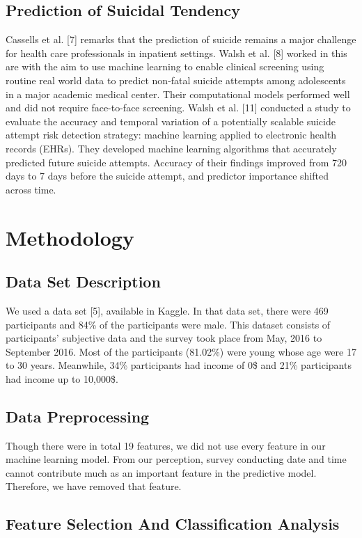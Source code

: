 \documentclass[conference]{IEEEtran}
\begin{document}
\subsection{Prediction of Suicidal Tendency}
Cassells et al. [7] remarks that the prediction of suicide remains a major challenge for health care professionals in inpatient settings. Walsh et al. [8] worked in this are with the aim to use machine learning to enable clinical screening using routine real world data to predict non-fatal suicide attempts among adolescents in a major academic medical center. Their computational models performed well and did not require face-to-face screening. Walsh et al. [11] conducted a study to evaluate the accuracy and temporal variation of a potentially scalable suicide attempt risk detection strategy: machine learning applied to electronic health records (EHRs). They developed machine learning algorithms that accurately predicted future suicide attempts. Accuracy of their findings improved from 720 days to 7 days before the suicide attempt, and predictor importance shifted across time.

\section{Methodology}

\subsection{Data Set Description}
We used a data set [5], available in Kaggle. In that data set, there were 469 participants and 84\% of the participants were male. This dataset consists of participants’ subjective data and the survey took place from May, 2016 to September 2016. Most of the participants (81.02\%) were young whose age were 17 to 30 years. Meanwhile, 34\% participants had income of 0\$ and 21\% participants had income up to 10,000\$.

\subsection{Data Preprocessing}
Though there were in total 19 features, we did not use every feature in our machine learning model. From our perception, survey conducting date and time cannot contribute much as an important feature in the predictive model. Therefore, we have removed that feature.
\subsection{Feature Selection And Classification Analysis}
\end{document}
